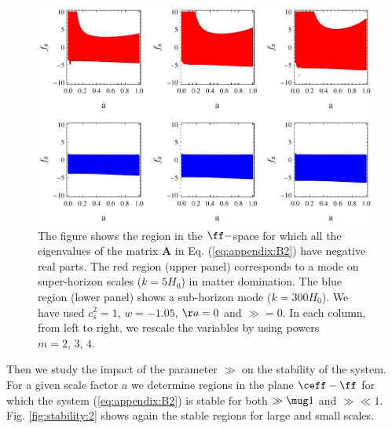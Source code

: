\begin{figure}[tb]
\centering
\includegraphics[scale=1]{figures/chapter-ade/stability.pdf} 
\caption{The figure shows the region in the $ \ff-$space for which all the eigenvalues of the matrix $ \mathbf{A} $ in Eq. (\ref{eq:appendix:B2}) have negative real parts. The red region (upper panel) corresponds to a mode on super-horizon scales ($k=5 H_0$) in matter domination. The blue region (lower panel) shows a sub-horizon mode  ($ k=300 H_0 $). We have used $c_s^2 = 1$, $w=-1.05$, $\aa=0$ and $\gg=0$. In each column, from left to right, we rescale the variables by using powers $ m=2,\,3,\,4 $.}
\label{fig:stability}
\end{figure}

Then we study the impact of the parameter $ \gg $ on the stability of the system. For a given scale factor $ a $ we determine regions in the plane $ \ceff-\ff $ for which the system (\ref{eq:appendix:B2}) is stable for both $ \gg \mug 1 $ and $ \gg \ll 1 $. Fig. \ref{fig:stability:2} shows again the stable regions for large and small scales. 

